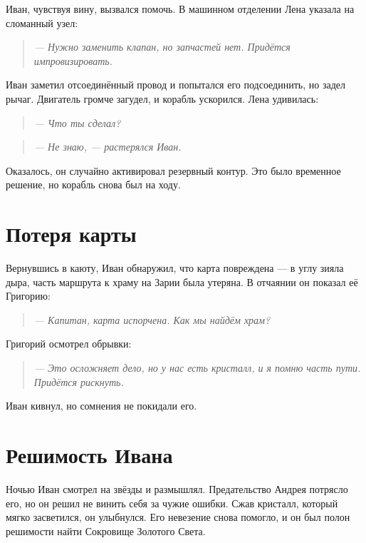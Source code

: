 \documentclass[12pt,a4paper]{book}
\newenvironment{dialogue}{\begin{quote}\itshape}{\end{quote}}
\begin{document}
Иван, чувствуя вину, вызвался помочь. В машинном отделении Лена указала на сломанный узел:

\begin{dialogue}
--- Нужно заменить клапан, но запчастей нет. Придётся импровизировать.
\end{dialogue}

Иван заметил отсоединённый провод и попытался его подсоединить, но задел рычаг. Двигатель громче загудел, и корабль ускорился. Лена удивилась:

\begin{dialogue}
--- Что ты сделал?
\end{dialogue}

\begin{dialogue}
--- Не знаю, --- растерялся Иван.
\end{dialogue}

Оказалось, он случайно активировал резервный контур. Это было временное решение, но корабль снова был на ходу.

\section*{Потеря карты}

Вернувшись в каюту, Иван обнаружил, что карта повреждена --- в углу зияла дыра, часть маршрута к храму на Зарии была утеряна. В отчаянии он показал её Григорию:

\begin{dialogue}
--- Капитан, карта испорчена. Как мы найдём храм?
\end{dialogue}

Григорий осмотрел обрывки:

\begin{dialogue}
--- Это осложняет дело, но у нас есть кристалл, и я помню часть пути. Придётся рискнуть.
\end{dialogue}

Иван кивнул, но сомнения не покидали его.

\section*{Решимость Ивана}

Ночью Иван смотрел на звёзды и размышлял. Предательство Андрея потрясло его, но он решил не винить себя за чужие ошибки. Сжав кристалл, который мягко засветился, он улыбнулся. Его невезение снова помогло, и он был полон решимости найти Сокровище Золотого Света.
\end{document}
